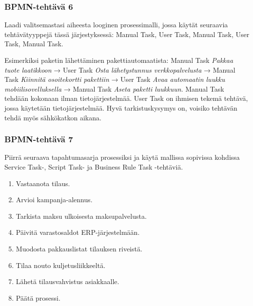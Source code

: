 \documentclass[
  finnish,
  letterpaper,
  DIV=11,
  numbers=noendperiod,
  oneside]{scrreprt}
\providecommand{\tightlist}{%
  \setlength{\itemsep}{0pt}\setlength{\parskip}{0pt}}
\begin{document}
\subsubsection{BPMN-tehtävä 6}\label{bpmn-tehtuxe4vuxe4-6}

Laadi valitsemastasi aiheesta looginen prosessimalli, jossa käytät
seuraavia tehtävätyyppejä tässä järjestyksessä: Manual Task, User Task,
Manual Task, User Task, Manual Task.

\begin{tcolorbox}[enhanced jigsaw, arc=.35mm, bottomrule=.15mm, bottomtitle=1mm, breakable, colback=white, colbacktitle=quarto-callout-tip-color!10!white, colframe=quarto-callout-tip-color-frame, coltitle=black, left=2mm, leftrule=.75mm, opacityback=0, opacitybacktitle=0.6, rightrule=.15mm, title=\textcolor{quarto-callout-tip-color}{\faLightbulb}\hspace{0.5em}{Malliratkaisu}, titlerule=0mm, toprule=.15mm, toptitle=1mm]

Esimerkiksi paketin lähettäminen pakettiautomaatista: Manual Task
\emph{Pakkaa tuote laatikkoon} → User Task \emph{Osta lähetystunnus
verkkopalvelusta} → Manual Task \emph{Kiinnitä osoitekortti pakettiin} →
User Task \emph{Avaa automaatin luukku mobiilisovelluksella} → Manual
Task \emph{Aseta paketti luukkuun}. Manual Task tehdään kokonaan ilman
tietojärjestelmää. User Task on ihmisen tekemä tehtävä, jossa käytetään
tietojärjestelmää. Hyvä tarkistuskysymys on, voisiko tehtävän tehdä myös
sähkökatkon aikana.

\end{tcolorbox}

\subsubsection{BPMN-tehtävä 7}\label{bpmn-tehtuxe4vuxe4-7}

Piirrä seuraava tapahtumasarja prosessiksi ja käytä mallissa sopivissa
kohdissa Service Task-, Script Task- ja Business Rule Task -tehtäviä.

\begin{enumerate}
\def\labelenumi{\arabic{enumi}.}
\tightlist
\item
  Vastaanota tilaus.
\item
  Arvioi kampanja-alennus.
\item
  Tarkista maksu ulkoisesta maksupalvelusta.
\item
  Päivitä varastosaldot ERP-järjestelmään.
\item
  Muodosta pakkauslistat tilauksen riveistä.
\item
  Tilaa nouto kuljetusliikkeeltä.
\item
  Lähetä tilausvahvistus asiakkaalle.
\item
  Päätä prosessi.
\end{enumerate}
\end{document}
